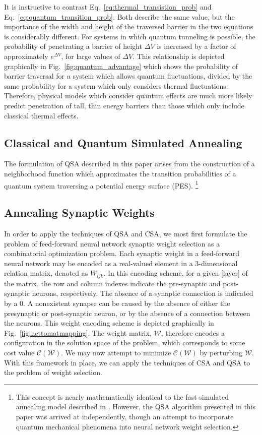 \documentclass[10pt,journal,cspaper,compsoc]{IEEEtran}
\begin{document}
It is instructive to contrast Eq.~\ref{eq:thermal_transistion_prob} and Eq.~\ref{eq:quantum_transition_prob}. Both describe the same value, but the importance of the width and height of the traversed barrier in the two equations is considerably different. For systems in which quantum tunneling is possible, the probability of penetrating a barrier of height $\Delta V$ is increased by a factor of approximately $e^{\Delta V}$, for large values of $\Delta V$. This relationship is depicted graphically in Fig.~\ref{fig:quantum_advantage} which shows the probability of barrier traversal for a system which allows quantum fluctuations, divided by the same probability for a system which only considers thermal fluctuations. Therefore, physical models which consider quantum effects are much more likely predict penetration of tall, thin energy barriers than those which only include classical thermal effects.


\subsection{Classical and Quantum Simulated Annealing}
\label{scn:classical_quantum_simulated_annealing}

The formulation of QSA described in this paper arises from the construction of a neighborhood function which approximates the transition probabilities of a quantum system traversing a potential energy surface (PES). \footnote{This concept is nearly mathematically identical to the fast simulated annealing model described in \cite{}. However, the QSA algorithm presented in this paper was arrived at independently, though an attempt to incorporate quantum mechanical phenomena into neural network weight selection.}



\subsection{Annealing Synaptic Weights}
\label{scn:weight_selection}

In order to apply the techniques of QSA and CSA, we most first formulate the problem of feed-forward neural network synaptic weight selection as a combinatorial optimization problem. Each synaptic weight in a feed-forward neural network may be encoded as a real-valued element in a 3-dimensional relation matrix, denoted as $\mathit{W}_{ijk}$. In this encoding scheme, for a given [layer] of the matrix, the row and column indexes indicate the pre-synaptic and post-synaptic neurons, respectively. The absence of a synaptic connection is indicated by a $0$. A nonexistent synapse can be caused by the absence of either the presynaptic or post-synaptic neuron, or by the absence of a connection between the neurons. This weight encoding scheme is depicted graphically in Fig.~\ref{fig:nettomatmapping}. The weight matrix, $\boldsymbol{\mathcal{W}}$, therefore encodes a configuration in the solution space of the problem, which corresponds to some cost value $\mathcal{C}(\boldsymbol{\mathcal{W}})$. We may now attempt to minimize $\mathcal{C}(\boldsymbol{\mathcal{W}})$ by perturbing $\boldsymbol{\mathcal{W}}$. With this framework in place, we can apply the techniques of CSA and QSA to the problem of weight selection.
\end{document}
